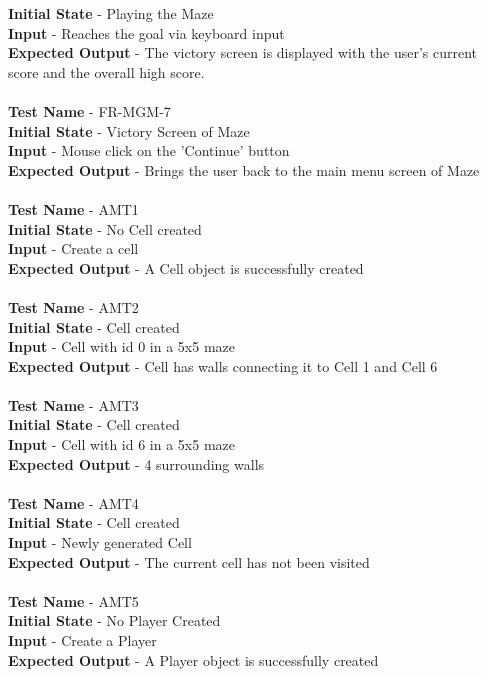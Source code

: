 \documentclass[12pt, titlepage]{article}
\begin{document}
\textbf{Initial State} - Playing the Maze\\
\textbf{Input} - Reaches the goal via keyboard input\\
\textbf{Expected Output} - The victory screen is displayed with the user's current score and the overall high score.\\ \\
\textbf{Test Name} - FR-MGM-7\\
\textbf{Initial State} - Victory Screen of Maze\\
\textbf{Input} - Mouse click on the 'Continue' button\\
\textbf{Expected Output} - Brings the user back to the main menu screen of Maze\\ \\
\textbf{Test Name} - AMT1\\
\textbf{Initial State} - No Cell created\\
\textbf{Input} - Create a cell\\
\textbf{Expected Output} - A Cell object is successfully created\\ \\
\textbf{Test Name} - AMT2\\
\textbf{Initial State} - Cell created\\
\textbf{Input} - Cell with id 0 in a 5x5 maze\\
\textbf{Expected Output} - Cell has walls connecting it to Cell 1 and Cell 6\\ \\
\textbf{Test Name} - AMT3\\
\textbf{Initial State} - Cell created\\
\textbf{Input} - Cell with id 6 in a 5x5 maze\\
\textbf{Expected Output} - 4 surrounding walls\\ \\
\textbf{Test Name} - AMT4\\
\textbf{Initial State} - Cell created\\
\textbf{Input} - Newly generated Cell\\
\textbf{Expected Output} - The current cell has not been visited\\ \\
\textbf{Test Name} - AMT5\\
\textbf{Initial State} - No Player Created\\
\textbf{Input} - Create a Player\\ 
\textbf{Expected Output} - A Player object is successfully created\\ \\
\end{document}
